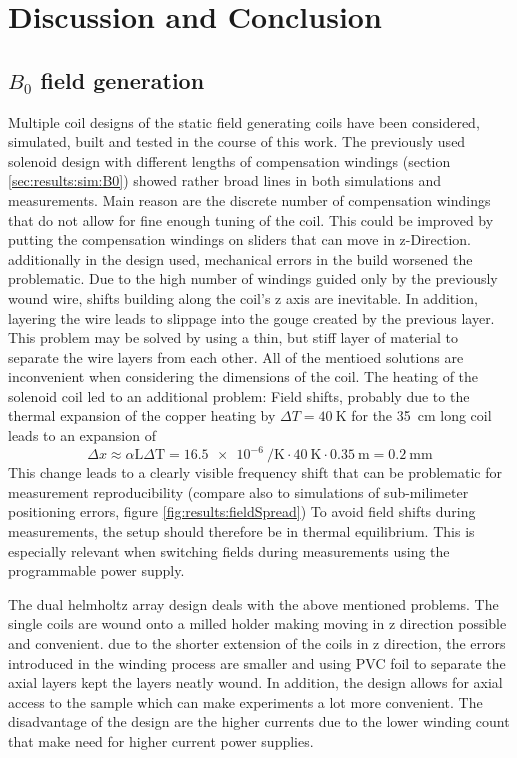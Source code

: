 \chapter{Discussion and Conclusion}\label{chap:conclusion}
    \section{$B_0$ field generation}
        Multiple coil designs of the static field generating coils have been considered, simulated, built and tested in the course of this work. The previously used solenoid design with different lengths of compensation windings (section \ref{sec:results:sim:B0}) showed rather broad lines in both simulations and measurements. Main reason are the discrete number of compensation windings that do not allow for fine enough tuning of the coil. This could be improved by putting the compensation windings on sliders that can move in z-Direction. additionally in the design used, mechanical errors in the build worsened the problematic. Due to the high number of windings guided only by the previously wound wire, shifts building along the coil's z axis are inevitable. In addition, layering the wire leads to slippage into the gouge created by the previous layer. This problem may be solved by using a thin, but stiff layer of material to separate the wire layers from each other. All of the mentioed solutions are inconvenient when considering the dimensions of the coil. 
        The heating of the solenoid coil led to an additional problem: Field shifts, probably due to the thermal expansion of the copper heating by $\Delta T = \SI{40}{\kelvin}$ for the \SI{35}{\centi\meter} long coil leads to an expansion of 
        \begin{equation}
            \Delta x \approx \alpha \mathrm{L}\Delta\mathrm{T}= \SI{16.5e-6}{\per\kelvin}\cdot \SI{40}{\kelvin} \cdot \SI{0.35}{\meter} = \SI{0.2}{\milli\meter}
        \end{equation}
        This change leads to a clearly visible frequency shift that can be problematic for measurement reproducibility (compare also to simulations of sub-milimeter positioning errors, figure \ref{fig:results:fieldSpread})
        To avoid field shifts during measurements, the setup should therefore be in thermal equilibrium. This is especially relevant when switching fields during measurements using the programmable power supply.

        The dual helmholtz array design deals with the above mentioned problems. The single coils are wound onto a milled holder making moving in z direction possible and convenient. due to the shorter extension of the coils in z direction, the errors introduced in the winding process are smaller and using PVC foil to separate the axial layers kept the layers neatly wound.
        In addition, the design allows for axial access to the sample which can make experiments a lot more convenient. The disadvantage of the design are the higher currents due to the lower winding count that make need for higher current power supplies.
